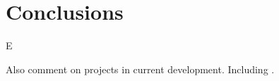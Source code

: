 \chapter{Conclusions}
\label{cha:conclusion}

E

Also comment on projects in current development. Including \cite{ID70, ID72, ID67}.

